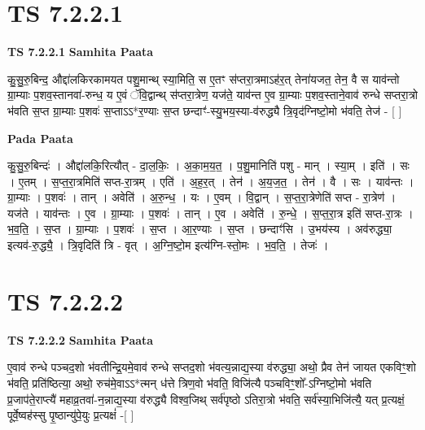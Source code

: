 \documentclass[17pt]{extarticle}
\begin{document}

\section{ TS 7.2.2.1 }

\textbf{TS 7.2.2.1 } \newline
\textbf{Samhita Paata} \newline

कु॒सु॒रु॒बिन्द॒ औद्दा॑लकिरकामयत पशु॒मान्थ् स्या॒मिति॒ स ए॒तꣳ स॑प्तरा॒त्रमाऽह॑र॒त् तेना॑यजत॒ तेन॒ वै स याव॑न्तो ग्रा॒म्याः प॒शव॒स्तानवा॑-रुन्ध॒ य ए॒वं ॅवि॒द्वान्थ् स॑प्तरा॒त्रेण॒ यज॑ते॒ याव॑न्त ए॒व ग्रा॒म्याः प॒शव॒स्ताने॒वाव॑ रुन्धे सप्तरा॒त्रो भ॑वति स॒प्त ग्रा॒म्याः प॒शवः॑ स॒प्ताऽऽ*र॒ण्याः स॒प्त छन्दाꣳ॑-स्यु॒भय॒स्या-व॑रुद्ध्यै त्रि॒वृद॑ग्निष्टो॒मो भ॑वति॒ तेज॑ - [  ] \newline

\textbf{Pada Paata} \newline

कु॒सु॒रु॒बिन्दः॑ । औद्दा॑लकि॒रित्यौत् - दा॒ल॒किः॒ । अ॒का॒म॒य॒त॒ । प॒शु॒मानिति॑ पशु - मान् । स्या॒म् । इति॑ । सः । ए॒तम् । स॒प्त॒रा॒त्रमिति॑ सप्त-रा॒त्रम् । एति॑ । अ॒ह॒र॒त् । तेन॑ । अ॒य॒ज॒त॒ । तेन॑ । वै । सः । याव॑न्तः । ग्रा॒म्याः । प॒शवः॑ । तान् । अवेति॑ । अ॒रु॒न्ध॒ । यः । ए॒वम् । वि॒द्वान् । स॒प्त॒रा॒त्रेणेति॑ सप्त - रा॒त्रेण॑ । यज॑ते । याव॑न्तः । ए॒व । ग्रा॒म्याः । प॒शवः॑ । तान् । ए॒व । अवेति॑ । रु॒न्धे॒ । स॒प्त॒रा॒त्र इति॑ सप्त-रा॒त्रः । भ॒व॒ति॒ । स॒प्त । ग्रा॒म्याः । प॒शवः॑ । स॒प्त । आ॒र॒ण्याः । स॒प्त । छन्दाꣳ॑सि । उ॒भय॑स्य । अव॑रुद्ध्या॒ इत्यव॑-रु॒द्ध्यै॒ । त्रि॒वृदिति॑ त्रि - वृत् । अ॒ग्नि॒ष्टो॒म इत्य॑ग्नि-स्तो॒मः । भ॒व॒ति॒ । तेजः॑ ।  \newline





\section{ TS 7.2.2.2 }

\textbf{TS 7.2.2.2 } \newline
\textbf{Samhita Paata} \newline

ए॒वाव॑ रुन्धे पञ्चद॒शो भ॑वतीन्द्रि॒यमे॒वाव॑ रुन्धे सप्तद॒शो भ॑वत्य॒न्नाद्य॒स्या व॑रुद्ध्या॒ अथो॒ प्रैव तेन॑ जायत एकविꣳ॒॒शो भ॑वति॒ प्रति॑ष्ठित्या॒ अथो॒ रुच॑मे॒वाऽऽ*त्मन् ध॑त्ते त्रिण॒वो भ॑वति॒ विजि॑त्यै पञ्चविꣳ॒॒शो᳚-ऽग्निष्टो॒मो भ॑वति प्र॒जाप॑ते॒राप्त्यै॑ महाव्र॒तवा॑-न॒न्नाद्य॒स्या व॑रुद्ध्यै विश्व॒जिथ् सर्व॑पृष्ठो ऽतिरा॒त्रो भ॑वति॒ सर्व॑स्या॒भिजि॑त्यै॒ यत् प्र॒त्यक्षं॒ पूर्वे॒ष्वह॑स्सु पृ॒ष्ठान्यु॑पे॒युः प्र॒त्यक्षं॑ -[  ] \newline
\end{document}

